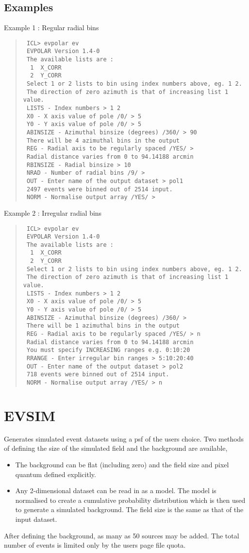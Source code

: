 \documentclass{book}
\renewcommand{\_}{{\tt\char'137}}     %
\begin{document}
\subsection{Examples}
Example 1 : Regular radial bins
\begin{quote}\begin{verbatim}
 ICL> evpolar ev
 EVPOLAR Version 1.4-0
 The available lists are :
  1  X_CORR
  2  Y_CORR
 Select 1 or 2 lists to bin using index numbers above, eg. 1 2.
 The direction of zero azimuth is that of increasing list 1 value.
 LISTS - Index numbers > 1 2
 X0 - X axis value of pole /0/ > 5
 Y0 - Y axis value of pole /0/ > 5
 ABINSIZE - Azimuthal binsize (degrees) /360/ > 90
 There will be 4 azimuthal bins in the output
 REG - Radial axis to be regularly spaced /YES/ >
 Radial distance varies from 0 to 94.14188 arcmin
 RBINSIZE - Radial binsize > 10
 NRAD - Number of radial bins /9/ >
 OUT - Enter name of the output dataset > pol1
 2497 events were binned out of 2514 input.
 NORM - Normalise output array /YES/ >
\end{verbatim}\end{quote}
Example 2 : Irregular radial bins
\begin{quote}\begin{verbatim}
 ICL> evpolar ev
 EVPOLAR Version 1.4-0
 The available lists are :
  1  X_CORR
  2  Y_CORR
 Select 1 or 2 lists to bin using index numbers above, eg. 1 2.
 The direction of zero azimuth is that of increasing list 1 value.
 LISTS - Index numbers > 1 2
 X0 - X axis value of pole /0/ > 5
 Y0 - Y axis value of pole /0/ > 5
 ABINSIZE - Azimuthal binsize (degrees) /360/ >
 There will be 1 azimuthal bins in the output
 REG - Radial axis to be regularly spaced /YES/ > n
 Radial distance varies from 0 to 94.14188 arcmin
 You must specify INCREASING ranges e.g. 0:10:20
 RRANGE - Enter irregular bin ranges > 5:10:20:40
 OUT - Enter name of the output dataset > pol2
 718 events were binned out of 2514 input.
 NORM - Normalise output array /YES/ > n
\end{verbatim}\end{quote}
\section{EVSIM}
Generates simulated event datasets using a psf of the users choice.
Two methods of defining the size of the simulated field and the
background are available,
\begin{itemize}
\item The background can be flat (including zero) and the field size
and pixel quantum defined explicitly.
\item Any 2-dimensional dataset can be read in as a model. The model
is normalised to create a cumulative probability distribution
which is then used to generate a simulated background. The
field size is the same as that of the input dataset.
\end{itemize}
After defining the background, as many as 50 sources may be added.
The total number of events is limited only by the users page file
quota.
\end{document}
